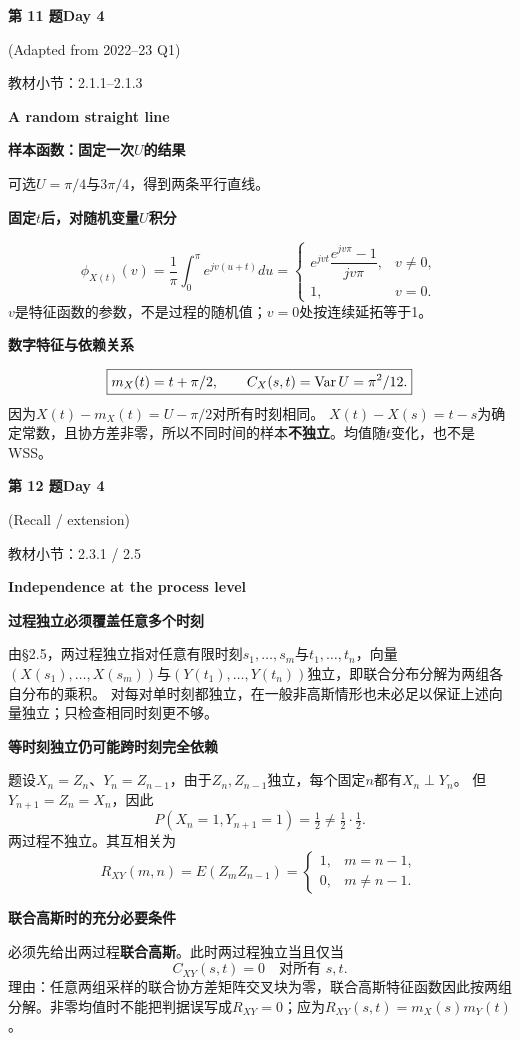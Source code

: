 \documentclass[10.5pt,fontset=fandol]{ctexart}
\newcommand{\key}[1]{\par\vspace{4pt}\noindent\textbf{\color{navy}#1}\par\vspace{2pt}}
\newcommand{\qtitle}[2]{\par\addvspace{1.2em}\Needspace{8\baselineskip}\begin{tcolorbox}[colback=navy,colframe=navy,arc=1.5pt,boxrule=0pt]\color{white}\large\bfseries #1\hfill\small #2\end{tcolorbox}}
\begin{document}
\qtitle{第 11 题}{Day 4}
{\small\color{accentred}(Adapted from 2022--23 Q1)}\par\smallskip
{\small\color{muted}教材小节：2.1.1--2.1.3}\par\medskip
\noindent\textbf{A random straight line}\par\smallskip\begin{tcolorbox}[breakable,colback=qbg,colframe=qbg,boxrule=0pt]\key{样本函数：固定一次$U$的结果}
可选$U=\pi/4$与$3\pi/4$，得到两条平行直线。
\begin{center}\end{center}
\key{固定$t$后，对随机变量$U$积分}
\[\phi_{X(t)}(v)=\frac1\pi\int_0^\pi e^{jv(u+t)}du=
\begin{cases}e^{jvt}\dfrac{e^{jv\pi}-1}{jv\pi},&v\ne0,\\1,&v=0.\end{cases}\]
$v$是特征函数的参数，不是过程的随机值；$v=0$处按连续延拓等于1。
\key{数字特征与依赖关系}
\[\boxed{m_X(t)=t+\pi/2,\qquad C_X(s,t)=\operatorname{Var} U=\pi^2/12.}\]
因为$X(t)-m_X(t)=U-\pi/2$对所有时刻相同。
$X(t)-X(s)=t-s$为确定常数，且协方差非零，所以不同时间的样本\textbf{不独立}。均值随$t$变化，也不是WSS。

\end{tcolorbox}
\qtitle{第 12 题}{Day 4}
{\small\color{accentred}(Recall / extension)}\par\smallskip
{\small\color{muted}教材小节：2.3.1 / 2.5}\par\medskip
\noindent\textbf{Independence at the process level}\par\smallskip\begin{tcolorbox}[breakable,colback=qbg,colframe=qbg,boxrule=0pt]\key{过程独立必须覆盖任意多个时刻}
由§2.5，两过程独立指对任意有限时刻$s_1,\ldots,s_m$与$t_1,\ldots,t_n$，向量
$(X(s_1),\ldots,X(s_m))$与$(Y(t_1),\ldots,Y(t_n))$独立，即联合分布分解为两组各自分布的乘积。
对每对单时刻都独立，在一般非高斯情形也未必足以保证上述向量独立；只检查相同时刻更不够。
\key{等时刻独立仍可能跨时刻完全依赖}
题设$X_n=Z_n$、$Y_n=Z_{n-1}$，由于$Z_n,Z_{n-1}$独立，每个固定$n$都有$X_n\perp Y_n$。
但$Y_{n+1}=Z_n=X_n$，因此
\[P(X_n=1,Y_{n+1}=1)=\tfrac12\ne\tfrac12\cdot\tfrac12.\]
两过程不独立。其互相关为
\[R_{XY}(m,n)=E(Z_mZ_{n-1})=\begin{cases}1,&m=n-1,\\0,&m\ne n-1.\end{cases}\]
\key{联合高斯时的充分必要条件}
必须先给出两过程\textbf{联合高斯}。此时两过程独立当且仅当
\[\boxed{C_{XY}(s,t)=0\quad\text{对所有 }s,t.}\]
理由：任意两组采样的联合协方差矩阵交叉块为零，联合高斯特征函数因此按两组分解。非零均值时不能把判据误写成$R_{XY}=0$；应为$R_{XY}(s,t)=m_X(s)m_Y(t)$。

\end{tcolorbox}
\end{document}
